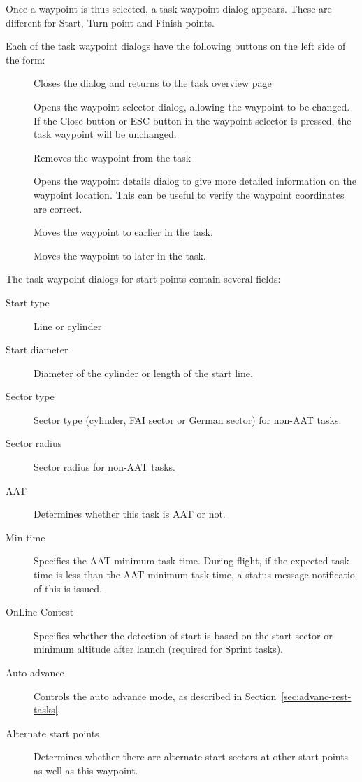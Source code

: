 \documentclass[a4paper,12pt]{refrep}
\begin{document}
Once a waypoint is thus selected, a task waypoint dialog appears.
These are different for Start, Turn-point and Finish points.

Each of the task waypoint dialogs have the following buttons on the
left side of the form:
\begin{description}
\item[] Closes the dialog and returns to the task overview page
\item[] Opens the waypoint selector dialog, allowing the waypoint to be
 changed.  If the Close button or ESC button in the waypoint selector
 is pressed, the task waypoint will be unchanged.
\item[] Removes the waypoint from the task
\item[] Opens the waypoint details dialog to give more detailed information on the waypoint location.  
This can be useful to verify the waypoint coordinates are correct.
\item[] Moves the waypoint to earlier in the task.
\item[] Moves the waypoint to later in the task.
\end{description}

The task waypoint dialogs for start points contain several fields:
\begin{description}
\item[Start type] Line or cylinder
\item[Start diameter] Diameter of the cylinder or length of the start line.
\item[Sector type] Sector type (cylinder, FAI sector or German sector) 
 for non-AAT tasks.
\item[Sector radius] Sector radius for non-AAT tasks.
\item[AAT] Determines whether this task is AAT or not.
\item[Min time] Specifies the AAT minimum task time.  During flight, if the expected task time is less than the AAT minimum task time, a status message notificatio of this is issued.
\item[OnLine Contest]  Specifies whether the detection of start is based
  on the start sector or minimum altitude after launch (required for
  Sprint tasks).
\item[Auto advance] Controls the auto advance mode, as described in Section~\ref{sec:advanc-rest-tasks}.
\item[Alternate start points]  Determines whether there are alternate start sectors at other start points as well as this waypoint.
\end{description}
\end{document}
